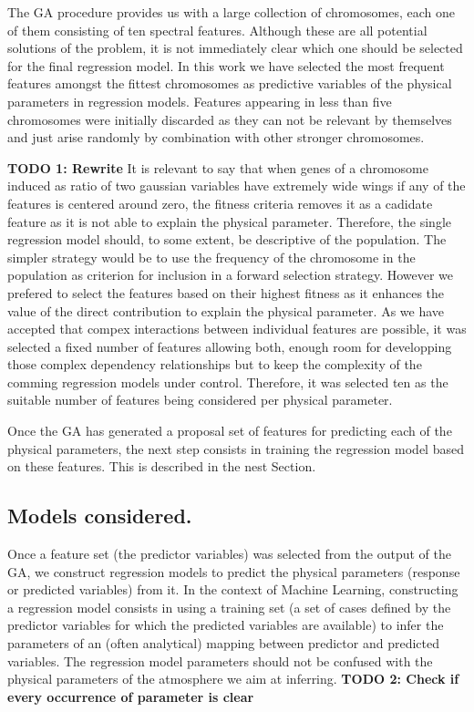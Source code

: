 The GA procedure provides us with a large collection of chromosomes,
each one of them consisting of ten spectral features.  Although these
are all potential solutions of the problem, it is not immediately
clear which one should be selected for the final regression model. In
this work we have selected the most frequent features amongst the
fittest chromosomes as predictive variables of the physical parameters
in regression models. Features appearing in less than five chromosomes
were initially discarded as they can not be relevant by themselves and
just arise randomly by combination with other stronger chromosomes.

{\bf TODO 1: Rewrite} It is relevant to say that when genes of a
chromosome induced as ratio of two gaussian variables have extremely
wide wings if any of the features is centered around zero, the fitness
criteria removes it as a cadidate feature as it is not able to explain
the physical parameter.  Therefore, the single regression model
should, to some extent, be descriptive of the population. The simpler
strategy would be to use the frequency of the chromosome in the
population as criterion for inclusion in a forward selection
strategy. However we prefered to select the features based on their
highest fitness as it enhances the value of the direct contribution to
explain the physical parameter.  As we have accepted that compex
interactions between individual features are possible, it was selected
a fixed number of features allowing both, enough room for developping
those complex dependency relationships but to keep the complexity of
the comming regression models under control.  Therefore, it was
selected ten as the suitable number of features being considered per
physical parameter.

Once the GA has generated a proposal set of features for predicting
each of the physical parameters, the next step consists in training
the regression model based on these features. This is described in the
nest Section.

\subsection{Models considered.}
\label {ssub:models}

Once a feature set (the predictor variables) was selected from the
output of the GA, we construct regression models to predict the
physical parameters (response or predicted variables) from it. In the
context of Machine Learning, constructing a regression model consists
in using a training set (a set of cases defined by the predictor
variables for which the predicted variables are available) to infer
the parameters of an (often analytical) mapping between predictor and
predicted variables. The regression model parameters should not be
confused with the physical parameters of the atmosphere we aim at
inferring. {\bf TODO 2: Check if every occurrence of parameter is clear}

